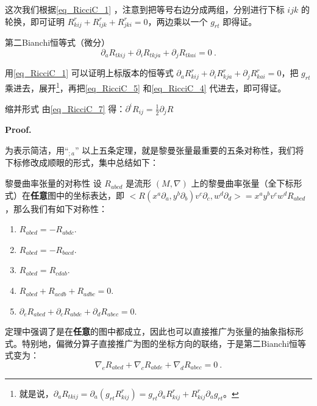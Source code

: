 这次我们根据\autoref{eq_RicciC_1} ，注意到把等号右边分成两组，分别进行下标 $ijk$ 的轮换，即可证明 $R^r_{kij}+R^r_{ijk}+R^r_{jki}=0$，两边乘以一个 $g_{rt}$ 即得证。

\begin{theorem}{第二Bianchi恒等式（微分）}\label{the_RicciC_3}
\begin{equation}\label{eq_RicciC_7}
\partial_aR_{tkij}+\partial_iR_{tkja}+\partial_jR_{tkai}=0~.
\end{equation}
\end{theorem}

用\autoref{eq_RicciC_1} 可以证明上标版本的恒等式 $\partial_aR_{kij}^r+\partial_iR_{kja}^r+\partial_jR_{kai}^r=0$，把 $g_{rt}$ 乘进去，展开\footnote{就是说，$\partial_aR_{tkij}=\partial_a(g_{rt}R^{r}_{kij})=g_{rt}\partial_aR^r_{kij}+R^r_{kij}\partial_ag_{rt}$。}，再把\autoref{eq_RicciC_5} 和\autoref{eq_RicciC_4} 代进去，即可得证。
\begin{corollary}{缩并形式}
由\autoref{eq_RicciC_7} 得：$\partial^iR_{ij}=\frac{1}{2}\partial_jR$
\end{corollary}
\textbf{Proof.}

为表示简洁，用“$_{;a}$”
以上五条定理，就是黎曼张量最重要的五条对称性，我们将下标修改成顺眼的形式，集中总结如下：



\begin{corollary}{黎曼曲率张量的对称性}
设 $R_{abcd}$ 是流形 $(M, \nabla)$ 上的黎曼曲率张量（全下标形式）在\textbf{任意}图中的坐标表达，即 $<R(x^a\partial_a, y^b\partial_b)v^c\partial_c, w^d\partial_d>=x^ay^bv^cw^dR_{abcd}$，那么我们有如下对称性：
\begin{enumerate}
\item $R_{abcd}=-R_{abdc}$.
\item $R_{abcd}=-R_{bacd}$.
\item $R_{abcd}=R_{cdab}$.
\item $R_{abcd}+R_{acdb}+R_{adbc}=0$.
\item $\partial_eR_{abcd}+\partial_cR_{abde}+\partial_dR_{abec}=0$.
\end{enumerate}
\end{corollary}





定理中强调了是在\textbf{任意}的图中都成立，因此也可以直接推广为张量的抽象指标形式。特别地，偏微分算子直接推广为图的坐标方向的联络，于是第二Bianchi恒等式变为：
\begin{equation}\label{eq_RicciC_8}
\nabla_eR_{abcd}+\nabla_cR_{abde}+\nabla_dR_{abec}=0~.
\end{equation}

